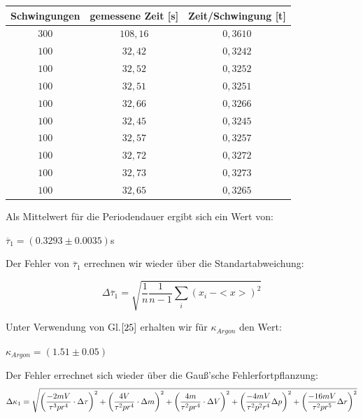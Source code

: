 \documentclass{article}
\begin{document}
{{\begin{center}
\begin{tabular}{c|c|c}
Schwingungen & gemessene Zeit [s]& Zeit/Schwingung [t]\\
\hline 
\(300\)	& \(108,16\)& \(0,3610\)\\
\(100\)	& \(32,42\)	& \(0,3242\)\\
\(100\)	& \(32,52\)	& \(0,3252\)\\
\(100\)	& \(32,51\)	& \(0,3251\)\\
\(100\)	& \(32,66\)	& \(0,3266\)\\
\(100\)	& \(32,45\)	& \(0,3245\)\\
\(100\)	& \(32,57\)	& \(0,3257\)\\
\(100\)	& \(32,72\)	& \(0,3272\)\\
\(100\)	& \(32,73\)	& \(0,3273\)\\
\(100\)	& \(32,65\)	& \(0,3265\)\\
\end{tabular}
\end{center}

\vspace{1cm}

Als Mittelwert für die Periodendauer ergibt sich ein Wert von:
\begin{center}
\(\overline{\tau}_{1} = (0.3293 \pm 0.0035)\)s
\end{center}

Der Fehler von \(\overline{\tau}_{1}\) errechnen wir wieder über die Standartabweichung:

\begin{equation}
\Delta \overline{\tau}_{1} = \sqrt{\frac{1}{n} \frac{1}{n-1}\sum\limits_{i}(x_i \ - <x>)^2}
\end{equation}

Unter Verwendung von Gl.\(\eqref{25}\) erhalten wir für \(\kappa_{Argon}\) den Wert:
\begin{center}
\(\kappa_{Argon} = (1.51 \pm 0.05)\)
\end{center}
Der Fehler errechnet sich wieder über die Gauß'sche Fehlerfortpflanzung:
\begin{equation}
\notag
\Delta \kappa_1 =\sqrt{\left( \frac{ -2mV}{ \tau^3 p r^4}\cdot \Delta \tau\right)^2 + \left( \frac{ 4V}{\tau^2 p r^4}\cdot \Delta m \right)^2+\left( \frac{4m }{\tau^2 p r^4}\cdot\Delta V \right)^2+\left( \frac{-4mV}{\tau^2 p^2 r^4}\Delta p \right)^2+\left( \frac{-16mV}{\tau^2 p r^5}\Delta r \right)^2}
\end{equation}

}}
\end{document}
